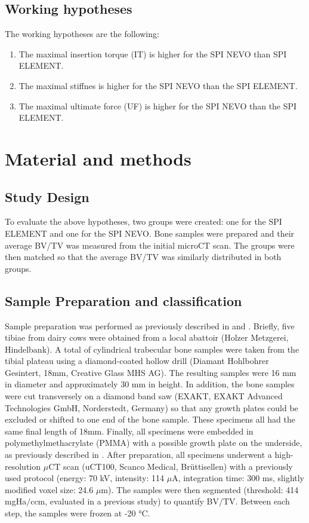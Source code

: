 \documentclass[12pt, a4paper, twoside]{report}
\begin{document}
%
%
%
\section{Working hypotheses}
%
The working hypotheses are the following:
\begin{enumerate}
\item The maximal insertion torque (IT) is higher for the SPI NEVO than SPI ELEMENT.
\item The maximal stiffnes is higher for the SPI NEVO than the SPI ELEMENT.
\item The maximal ultimate force (UF) is higher for the SPI NEVO than the SPI ELEMENT.
\end{enumerate}

%
%
%
\chapter{Material and methods}
%
%
%
\section{Study Design}
%
To evaluate the above hypotheses, two groups were created: one for the SPI ELEMENT and one for the SPI NEVO.
Bone samples were prepared and their average BV/TV was measured from the initial microCT scan.
The groups were then matched so that the average BV/TV was similarly distributed in both groups.
%
%
\section{Sample Preparation and classification}
%
Sample preparation was performed as previously described in \citet{wili_experimental_2021} and \citet{voumard_peroperative_2019}.
Briefly, five tibiae from dairy cows were obtained from a local abattoir (Holzer Metzgerei, Hindelbank).
A total of cylindrical trabecular bone samples were taken from the tibial plateau using a diamond-coated hollow drill (Diamant Hohlbohrer Gesintert, 18mm, Creative Glass MHS AG).
The resulting samples were 16 mm in diameter and approximately 30 mm in height.
In addition, the bone samples were cut transversely on a diamond band saw (EXAKT, EXAKT Advanced Technologies GmbH, Norderstedt, Germany) so that any growth plates could be excluded or shifted to one end of the bone sample.
These specimens all had the same final length of 18mm.
Finally, all specimens were embedded in polymethylmethacrylate (PMMA) with a possible growth plate on the underside, as previously described in \cite{voumard_peroperative_2019}.
After preparation, all specimens underwent a high-resolution $\mu$CT scan (uCT100, Scanco Medical, Br\"{u}ttisellen) with a previously used protocol (energy: 70 kV, intensity: 114 $\mu$A, integration time: 300 ms, slightly modified voxel size: 24.6 $\mu$m).
The samples were then segmented (threshold: 414 mgHa$/$ccm, evaluated in a previous study) to quantify BV$/$TV.
Between each step, the samples were frozen at -20 °C.
\end{document}
